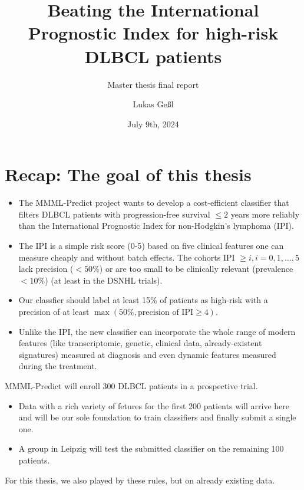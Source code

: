 \documentclass[10pt, aspectratio=169]{beamer}
\title{Beating the International Prognostic Index for high-risk DLBCL patients}
\subtitle{Master thesis final report}
\date{July 9th, 2024}
\author{Lukas Geßl}
\institute{Chair of Statistical Bioinformatics, Regensburg University}
\begin{document}
\maketitle

\section{Recap: The goal of this thesis}

\begin{frame}{}
  \begin{itemize}
    \item The MMML-Predict project wants to develop a cost-efficient classifier 
    that filters DLBCL patients with progression-free survival $\leq 2$ years more reliably 
    than the International Prognostic Index for non-Hodgkin's lymphoma (IPI).
    \item The IPI \cite{ipi93} is a simple risk score (0-5) based on five clinical features one can
    measure cheaply and without batch effects. The cohorts IPI $\geq i, i = 0, 1, \ldots, 5$
    lack precision ($< 50 \%$) or are too small to be clinically relevant
    (prevalence $< 10 \%$) (at least in the DSNHL trials).
    \item Our classfier should label at least 15\% of patients as high-risk with a precision
    of at least $\max(50\%, \text{precision of IPI} \geq 4)$.
    \item Unlike the IPI, the new classifier can incorporate the whole range of 
    modern features (like transcriptomic, genetic, clinical data, already-existent 
    signatures) measured at diagnosis and even dynamic features measured during 
    the treatment.
  \end{itemize}
\end{frame}

\begin{frame}
  MMML-Predict will enroll 300 DLBCL patients in a prospective trial.
  \begin{itemize}
    \item Data with a rich variety of fetures for the first 200 patients will 
      arrive here and will be our sole foundation to train classifiers and 
      finally submit a single one.
    \item A group in Leipzig will test the submitted classifier on the remaining 
      100 patients.
  \end{itemize}
  For this thesis, we also played by these rules, but on already existing data.
\end{frame}
\end{document}
